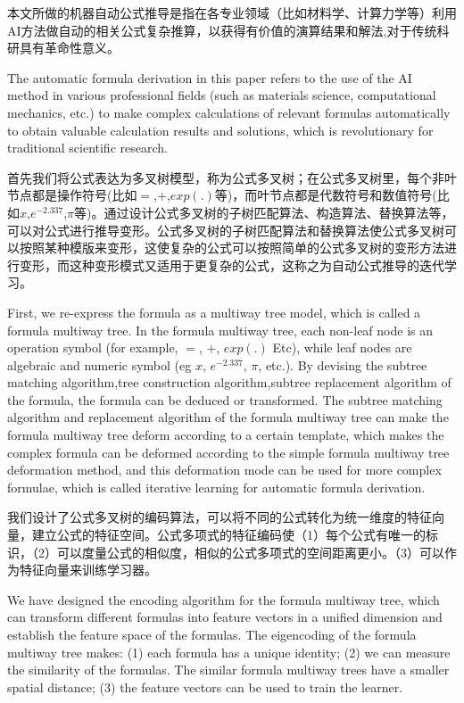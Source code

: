 \documentclass[runningheads]{llncs}
\begin{document}
本文所做的机器自动公式推导是指在各专业领域（比如材料学、计算力学等）利用AI方法做自动的相关公式复杂推算，以获得有价值的演算结果和解法,对于传统科研具有革命性意义。

The automatic formula derivation in this paper refers to the use of the AI method in various professional fields (such as materials science, computational mechanics, etc.) to make complex calculations of relevant formulas automatically to obtain valuable calculation results and solutions, which is revolutionary for traditional scientific research.

首先我们将公式表达为多叉树模型，称为公式多叉树；在公式多叉树里，每个非叶节点都是操作符号(比如$=$,$+$,$exp(.)$等)，而叶节点都是代数符号和数值符号(比如$x$,$e^{-2.337}$,$\pi$等)。通过设计公式多叉树的子树匹配算法、构造算法、替换算法等，可以对公式进行推导变形。公式多叉树的子树匹配算法和替换算法使公式多叉树可以按照某种模版来变形，这使复杂的公式可以按照简单的公式多叉树的变形方法进行变形，而这种变形模式又适用于更复杂的公式，这称之为自动公式推导的迭代学习。

First, we re-express the formula as a multiway tree model, which is called a formula multiway tree. In the formula multiway tree, each non-leaf node is an operation symbol (for example, $=$, $+$, $exp(.)$ Etc), while leaf nodes are algebraic and numeric symbol (eg $x$, $e^{-2.337}$, $\pi$, etc.). By devising the subtree matching algorithm,tree construction algorithm,subtree replacement algorithm of the formula, the formula can be deduced or transformed. The subtree matching algorithm and replacement algorithm of the formula multiway tree can make the formula multiway tree deform according to a certain template, which makes the complex formula can be deformed according to the simple formula multiway tree deformation method, and this deformation mode can be used for more complex formulae, which is called iterative learning for automatic formula derivation.

我们设计了公式多叉树的编码算法，可以将不同的公式转化为统一维度的特征向量，建立公式的特征空间。公式多项式的特征编码使（1）每个公式有唯一的标识，（2）可以度量公式的相似度，相似的公式多项式的空间距离更小。（3）可以作为特征向量来训练学习器。

We have designed the encoding algorithm for the formula multiway tree, which can transform different formulas into feature vectors in a unified dimension and establish the feature space of the formulas. The eigencoding of the formula multiway tree makes: 
(1) each formula has a unique identity;
(2) we can measure the similarity of the formulas. The similar formula multiway trees have a smaller spatial distance;
(3) the feature vectors can be used to train the learner.
\end{document}
